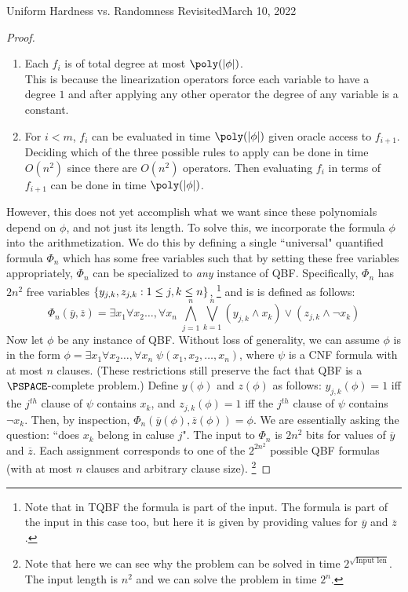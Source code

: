 \begin{lecture}{8}{Uniform Hardness vs. Randomness Revisited}{March 10, 2022}
\begin{proof}
\begin{enumerate}
	\item Each $f_i$ is of total degree at most $\poly(\card{\phi})$. \\
	This is because the linearization operators force each variable to have a degree $1$ and after applying any other operator the degree of any variable is a constant.
	
	\item For $i < m$, $f_i$ can be evaluated in time $\poly(\card{\phi})$ given oracle access to $f_{i+1}$. \\
	Deciding which of the three possible rules to apply can be done in time $O(n^2)$ since there are $O(n^2)$ operators. Then evaluating $f_i$ in terms of $f_{i+1}$ can be done in time $\poly(\card{\phi})$.
\end{enumerate}

However, this does not yet accomplish what we want since these polynomials depend on $\phi$, and not just its length. To solve this, we incorporate the formula $\phi$ into the arithmetization. We do this by defining a single ``universal" quantified formula $\Phi_n$ which has some free variables such that by setting these free variables appropriately, $\Phi_n$ can be specialized to \emph{any} instance of QBF. Specifically, $\Phi_n$ has $2n^2$ free variables $\{y_{j,k}, z_{j,k} : 1 \leq j, k \leq n\}$, \footnote{Note that in TQBF the formula is part of the input. The formula is part of the input in this case too, but here it is given by providing values for $\overline{y}$ and $\overline{z}$. }
and is is defined as follows:
\[
	\Phi_n(\overline{y}, \overline{z}) = \exists x_1 \forall x_2 \ldots , \forall x_n \; \bigwedge_{j=1}^n \bigvee_{k=1}^n (y_{j,k} \wedge x_k) \vee (z_{j,k} \wedge \neg x_k)
\]
Now let $\phi$ be any instance of QBF. Without loss of generality, we can assume $\phi$ is in the form $\phi = \exists x_1 \forall x_2 \ldots , \forall x_n \; \psi(x_1,x_2, \ldots, x_n)$, where $\psi$ is a CNF formula with at most $n$ clauses. (These restrictions still preserve the fact that QBF is a $\PSPACE$-complete problem.)
Define $y(\phi)$ and $z(\phi)$ as follows: $y_{j,k}(\phi) = 1$ iff the $j^{th}$ clause of $\psi$ contains $x_k$, and $z_{j,k}(\phi) = 1$ iff the $j^{th}$ clause of $\psi$ contains $\neg x_k$. Then, by inspection, $\Phi_n(\overline{y}(\phi), \overline{z}(\phi)) = \phi$.
We are essentially asking the question: ``does $x_k$ belong in caluse $j$". The input to $\Phi_n$ is $2n^2$ bits for values of $\overline{y}$ and $\overline{z}$. Each assignment corresponds to one of the $2^{2n^2}$ possible QBF formulas (with at most $n$ clauses and arbitrary clause size). \footnote{Note that here we can see why the problem can be solved in time $2^{\sqrt{\text{Input len}}}$. The input length is $n^2$ and we can solve the problem in time $2^n$.}



\end{proof}
\end{lecture}
